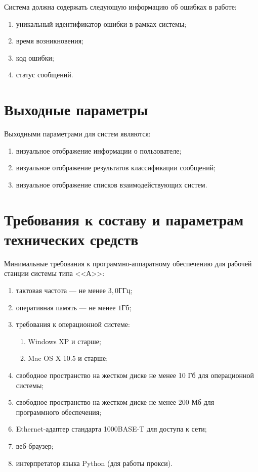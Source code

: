 Система должна содержать следующую информацию об ошибках в работе:
\begin{enumerate}
	\item уникальный идентификатор ошибки в рамках системы;
	\item время возникновения;
	\item код ошибки;
	\item статус сообщений.
\end{enumerate}

\section{Выходные параметры}
Выходными параметрами для систем являются:

\begin{enumerate}
	\item визуальное отображение информации о пользователе;
	\item визуальное отображение результатов классификации сообщений;
	\item визуальное отображение списков взаимодействующих систем.
\end{enumerate}

\section{Требования к составу и параметрам технических средств}
Минимальные требования к программно-аппаратному обеспечению для рабочей станции системы типа <<А>>:

\begin{enumerate}
	\item тактовая частота  --- не менее $3,0 \text{ГГц}$;
	\item оперативная память --- не менее $1 \text{Гб}$;
	\item требования к операционной системе:
	\begin{enumerate}
		\item Windows XP и старше;
		\item Mac OS X 10.5 и старше;
	\end{enumerate}
	\item свободное пространство на жестком диске не менее 10 Гб для операционной системы;
	\item свободное пространство на жестком диске не менее 200 Мб для программного обеспечения;
	\item Ethernet-адаптер стандарта 1000BASE-T для доступа к сети;
	\item веб-браузер;
	\item интерпретатор языка Python (для работы прокси).
\end{enumerate}

